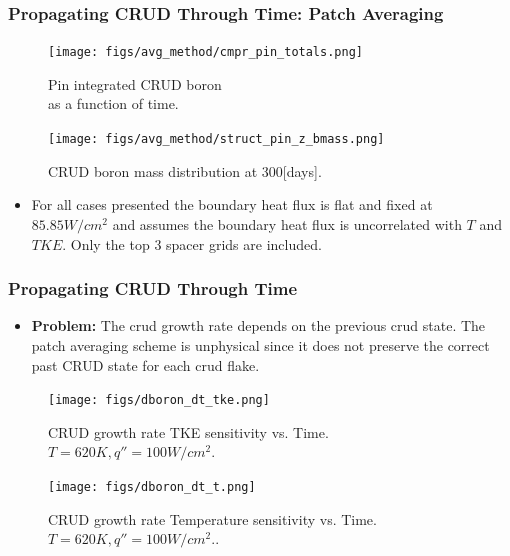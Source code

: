 \documentclass[t, pdftex]{beamer}
\begin{document}
\begin{frame}[shrink=10]
\frametitle{Propagating CRUD Through Time: Patch Averaging}
\begin{figure}[!htbp]
\centering
\begin{minipage}{.5\textwidth}
  \texttt{[image: figs/avg\_method/cmpr\_pin\_totals.png]}
\caption{Pin integrated CRUD boron \\ as a function of time.} 
\label{fig:crud_pre_map}
\end{minipage}%
\begin{minipage}{.5\textwidth}
  \texttt{[image: figs/avg\_method/struct\_pin\_z\_bmass.png]}
\caption{CRUD boron mass distribution at 300[days].}
\label{fig:crud_post_map}
\end{minipage}
\end{figure}
\begin{itemize}
\item \small For all cases presented the boundary heat flux is flat and fixed at $85.85 W/cm^2$ and assumes the boundary heat flux is uncorrelated with $T$ and $TKE$.  Only the top 3 spacer grids are included.
\end{itemize}
\end{frame}

\begin{frame}[shrink=10]
\frametitle{Propagating CRUD Through Time}
\begin{itemize}
\item  \textbf{Problem:}  The crud growth rate depends on the previous crud state.  The patch averaging scheme is unphysical since it does not preserve the correct past CRUD state for each crud flake. 
\end{itemize}
\begin{figure}[!htbp]
\centering
\begin{minipage}{.5\textwidth}
  \texttt{[image: figs/dboron\_dt\_tke.png]}
\caption{CRUD growth rate TKE sensitivity vs. Time. $T=620K, q''=100W/cm^2$.} 
\label{fig:crud_pre_map}
\end{minipage}%
\begin{minipage}{.5\textwidth}
  \texttt{[image: figs/dboron\_dt\_t.png]}
\caption{CRUD growth rate Temperature sensitivity vs. Time. $T=620K, q''=100W/cm^2$..}
\label{fig:crud_post_map}
\end{minipage}
\end{figure}
\end{frame}
\end{document}
